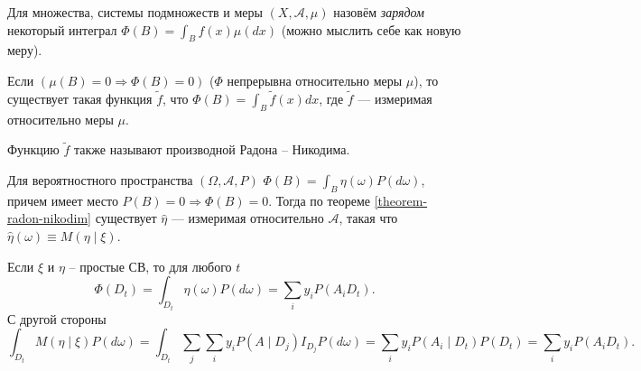 \begin{theorem}\label{theorem-radon-nikodim}
  Для множества, системы подмножеств и меры $(X, \mathscr{A}, \mu)$ назовём
  \emph{зарядом}
  некоторый интеграл $\Phi(B) = \int_B f(x) \mu(dx)$ (можно мыслить себе как новую меру).

  Если $(\mu(B) = 0 \Rightarrow \Phi(B) = 0)$ ($\Phi$ непрерывна относительно
  меры $\mu$),
  то существует такая функция $ \tilde f $, что 
  $\Phi(B) = \int_B \tilde f(x) dx$, где $\tilde f$ --- измеримая относительно
  меры $\mu$.

  Функцию $\tilde f$ также называют производной Радона -- Никодима.
\end{theorem}

\begin{definition}
  Для вероятностного пространства $(\Omega, \mathscr{A}, P)$ 
  $\Phi(B) = \int_B \eta(\omega) P(d\omega)$, причем имеет место $P(B) = 0
  \Rightarrow \Phi(B) = 0 $. Тогда по теореме \ref{theorem-radon-nikodim}
  существует $\hat{\eta}$ --- измеримая относительно $\mathscr{A}$, такая что
  $\hat{\eta} (\omega) \equiv M(\eta \mid  \xi)$.
\end{definition}

\begin{ex}
  Если $\xi$ и $\eta$ -- простые СВ, то 
  для любого $ t $
  \[
    \Phi(D_t) = \int_{D_t} \eta(\omega) P(d\omega) = \sum_i y_i P(A_i D_t).
  \]
  С другой стороны
  \[
    \int_{D_t} M(\eta \mid  \xi) P(d\omega) = \int_{D_t} \sum_j \sum_i y_i
    P(A\mid D_j) I_{D_j} P(d\omega)
    = \sum_i y_i P(A_i\mid D_t) P(D_t) = \sum_i y_i P(A_i D_t).
  \]
\end{ex}





